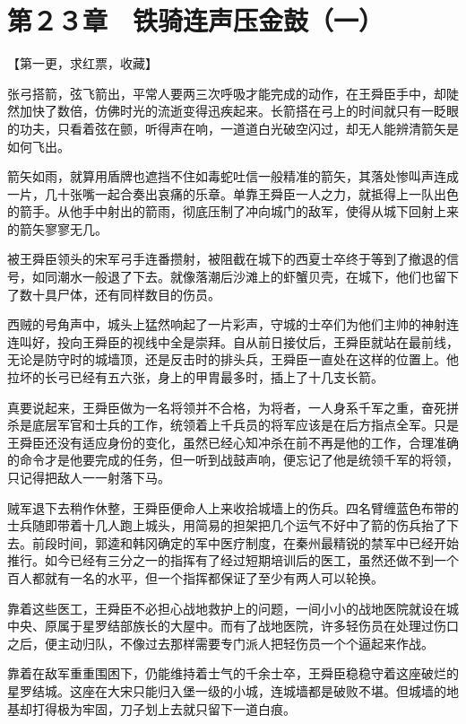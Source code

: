 \section{第２３章　铁骑连声压金鼓（一）}

【第一更，求红票，收藏】

张弓搭箭，弦飞箭出，平常人要两三次呼吸才能完成的动作，在王舜臣手中，却陡然加快了数倍，仿佛时光的流逝变得迅疾起来。长箭搭在弓上的时间就只有一眨眼的功夫，只看着弦在颤，听得声在响，一道道白光破空闪过，却无人能辨清箭矢是如何飞出。

箭矢如雨，就算用盾牌也遮挡不住如毒蛇吐信一般精准的箭矢，其落处惨叫声连成一片，几十张嘴一起合奏出哀痛的乐章。单靠王舜臣一人之力，就抵得上一队出色的箭手。从他手中射出的箭雨，彻底压制了冲向城门的敌军，使得从城下回射上来的箭矢寥寥无几。

被王舜臣领头的宋军弓手连番攒射，被阻截在城下的西夏士卒终于等到了撤退的信号，如同潮水一般退了下去。就像落潮后沙滩上的虾蟹贝壳，在城下，他们也留下了数十具尸体，还有同样数目的伤员。

西贼的号角声中，城头上猛然响起了一片彩声，守城的士卒们为他们主帅的神射连连叫好，投向王舜臣的视线中全是崇拜。自从前日接仗后，王舜臣就站在最前线，无论是防守时的城墙顶，还是反击时的排头兵，王舜臣一直处在这样的位置上。他拉坏的长弓已经有五六张，身上的甲胄最多时，插上了十几支长箭。

真要说起来，王舜臣做为一名将领并不合格，为将者，一人身系千军之重，奋死拼杀是底层军官和士兵的工作，统领着上千兵员的将军应该是在后方指点全军。只是王舜臣还没有适应身份的变化，虽然已经心知冲杀在前不再是他的工作，合理准确的命令才是他要完成的任务，但一听到战鼓声响，便忘记了他是统领千军的将领，只记得把敌人一一射落下马。

贼军退下去稍作休整，王舜臣便命人上来收拾城墙上的伤兵。四名臂缠蓝色布带的士兵随即带着十几人跑上城头，用简易的担架把几个运气不好中了箭的伤兵抬了下去。前段时间，郭逵和韩冈确定的军中医疗制度，在秦州最精锐的禁军中已经开始推行。如今已经有三分之一的指挥有了经过短期培训后的医工，虽然还做不到一个百人都就有一名的水平，但一个指挥都保证了至少有两人可以轮换。

靠着这些医工，王舜臣不必担心战地救护上的问题，一间小小的战地医院就设在城中央、原属于星罗结部族长的大屋中。而有了战地医院，许多轻伤员在处理过伤口之后，便主动归队，不像过去那样需要专门派人把轻伤员一个个逼起来作战。

靠着在敌军重重围困下，仍能维持着士气的千余士卒，王舜臣稳稳守着这座破烂的星罗结城。这座在大宋只能归入堡一级的小城，连城墙都是破败不堪。但城墙的地基却打得极为牢固，刀子划上去就只留下一道白痕。

